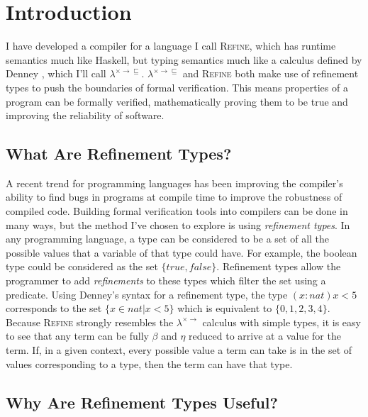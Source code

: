 \section{Introduction}

I have developed a compiler for a language I call \textsc{Refine},
which has runtime semantics much like Haskell, but typing semantics much like a calculus defined
by Denney \cite{denney98}, which I'll call $\lambda^{\times \rightarrow \sqsubseteq}$.
$\lambda^{\times \rightarrow \sqsubseteq}$ and \textsc{Refine} both make use of refinement types to push
the boundaries of formal verification.
This means properties of a program can be formally verified, mathematically proving them to be true
and improving the reliability of software.

\subsection{What Are Refinement Types?}

A recent trend for programming languages has been improving the compiler's ability to find
bugs in programs at compile time to improve the robustness of compiled code.
Building formal verification tools into compilers can be done in many ways, but the method
I've chosen to explore is using \textit{refinement types}.
In any programming language, a type can be considered to be a set of all the possible values
that a variable of that type could have.
For example, the boolean type could be considered as the set $\{true, false\}$.
Refinement types allow the programmer to add \textit{refinements} to these types which
filter the set using a predicate.
Using Denney's syntax for a refinement type, the type
$(x:nat)x<5$ corresponds to the set $\{x \in nat | x < 5\}$ which is equivalent to
$\{0, 1, 2, 3, 4\}$.
Because \textsc{Refine} strongly resembles the $\lambda^{\times \rightarrow}$ calculus
with simple types, it is easy to see that any term can be fully $\beta$ and $\eta$ reduced to
arrive at a value for the term.
If, in a given context, every possible value a term can take is in the set of values corresponding to
a type, then the term can have that type.

\subsection{Why Are Refinement Types Useful?}

